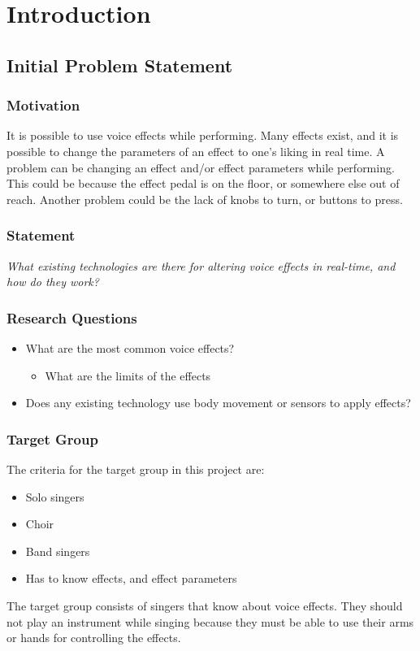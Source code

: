 \chapter{Introduction}

\section{Initial Problem Statement}

\subsection{Motivation}

It is possible to use voice effects while performing. Many effects exist, and it is possible to change the parameters of an effect to one's liking in real time. 
A problem can be changing an effect and/or effect parameters while performing. This could be because the effect pedal is on the floor, or somewhere else out of reach. Another problem could be the lack of knobs to turn, or buttons to press.

\subsection{Statement}

\textit{What existing technologies are there for altering voice effects in real-time, and how do they work?}


\subsection{Research Questions}

\begin{itemize}
	\item What are the most common voice effects?
	\begin{itemize}
		\item What are the limits of the effects
	\end{itemize}
	\item Does any existing technology use body movement or sensors to apply effects?
\end{itemize}

\subsection{Target Group}
The criteria for the target group in this project are:

\begin{itemize}
	\item Solo singers
	\item Choir
	\item Band singers
	\item Has to know effects, and effect parameters
\end{itemize}

The target group consists of singers that know about voice effects. They should not play an instrument while singing because they must be able to use their arms or hands for controlling the effects. 


